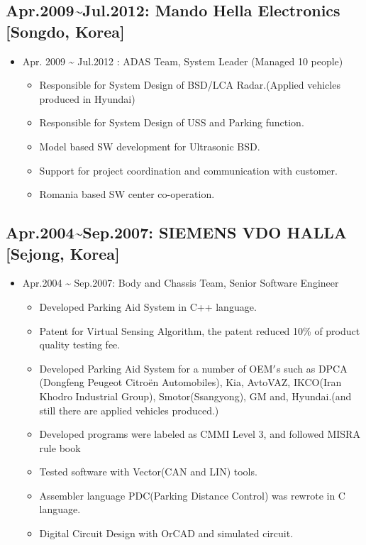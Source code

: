 \documentclass[12pt,a4paper]{article}
\begin{document}
\subsection{Apr.2009{\textasciitilde}Jul.2012: Mando Hella Electronics [Songdo, Korea]}
\begin{itemize}
\item Apr. 2009 {\textasciitilde} Jul.2012 : ADAS Team, System Leader (Managed 10 people)

\begin{itemize}
\item Responsible for System Design of BSD/LCA Radar.(Applied vehicles produced in Hyundai)


\item Responsible for System Design of USS and Parking function.


\item Model based SW development for Ultrasonic BSD.


\item Support for project coordination and communication with customer.


\item Romania based SW center co-operation.

\end{itemize}
\end{itemize}
\subsection{Apr.2004{\textasciitilde}Sep.2007: SIEMENS VDO HALLA [Sejong, Korea]}
\begin{itemize}
\item Apr.2004 {\textasciitilde} Sep.2007: Body and Chassis Team, Senior Software Engineer

\begin{itemize}
\item Developed Parking Aid System in C++ language.


\item Patent for Virtual Sensing Algorithm, the patent reduced 10\% of product quality testing fee.


\item Developed Parking Aid System for a number of OEM\ensuremath{\rq}s such as DPCA (Dongfeng Peugeot Citroën Automobiles), Kia, AvtoVAZ, IKCO(Iran Khodro Industrial Group), Smotor(Ssangyong), GM and, Hyundai.(and still there are applied vehicles produced.)


\item Developed programs were labeled as CMMI Level 3, and followed MISRA rule book


\item Tested software with Vector(CAN and LIN) tools.


\item Assembler language PDC(Parking Distance Control) was rewrote in C language.


\item Digital Circuit Design with OrCAD and simulated circuit.

\end{itemize}
\end{itemize}
\end{document}

